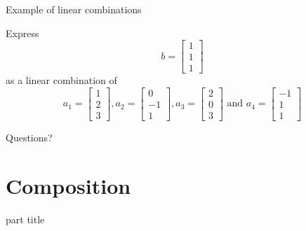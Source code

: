 \documentclass{beamer}
\begin{document}
\begin{frame}{Example of linear combinations}
  \begin{example}
    Express
    \begin{equation*}
      b = \left[\begin{array}{c}
          1 \\
                  1 \\
                  1
        \end{array}\right]
    \end{equation*}
    as a linear combination of
    \begin{equation*}
      a_1 = \left[
        \begin{array}{c}
          1 \\
          2 \\
          3
        \end{array}
      \right],
      a_2 = \left[
        \begin{array}{c}
          0 \\
          -1 \\
          1
        \end{array}\right],
      a_3 = \left[
        \begin{array}{c}
          2 \\
          0 \\
          3
        \end{array}
      \right]\text{ and }
      a_4 = \left[
        \begin{array}{c}
          -1 \\
          1 \\
          1
        \end{array}\right]
    \end{equation*}
  \end{example}
\end{frame}

\begin{frame}
  Questions?
\end{frame}

\section{Composition}

\begin{frame}
  \begin{beamercolorbox}[sep=12pt,center]{part title}
    \insertsection\par
  \end{beamercolorbox}
\end{frame}
\end{document}
